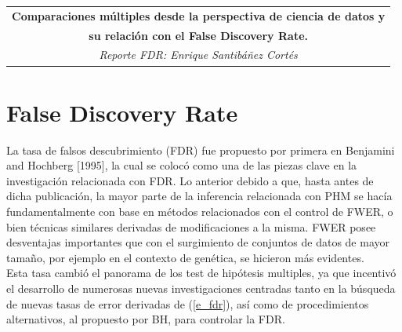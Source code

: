 \documentclass[11pt,letterpaper]{article}
\begin{document}
\begin{table}[ht]
\centering
\begin{tabular}{c}
\textbf{Comparaciones múltiples desde la perspectiva de ciencia de datos y}\\
\textbf{su relación con el False Discovery Rate.}\\
\textit{Reporte FDR: Enrique Santibáñez Cortés}
\end{tabular}
\end{table}
\section{False Discovery Rate}
La tasa de falsos descubrimiento (FDR) fue propuesto por primera en Benjamini and Hochberg [1995], la cual se colocó como una de las piezas clave en la investigación relacionada con FDR. Lo anterior debido a que, hasta antes de dicha publicación, la mayor parte de la inferencia relacionada con PHM se hacía fundamentalmente con base en métodos relacionados con el control de FWER, o bien técnicas similares derivadas de modificaciones a la misma. FWER posee desventajas importantes que con el surgimiento de conjuntos de datos de mayor tamaño, por ejemplo en el contexto de genética, se hicieron más evidentes.\\
Esta tasa cambió el panorama de los test de hipótesis multiples, ya que incentivó el desarrollo de numerosas nuevas investigaciones centradas tanto en la búsqueda de nuevas tasas de error derivadas de (\ref{e_fdr}), así como de procedimientos alternativos, al propuesto por BH, para controlar la FDR.\\
\end{document}
